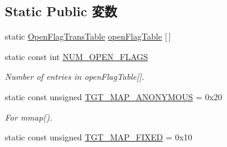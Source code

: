 \subsection*{Static Public 変数}
\begin{DoxyCompactItemize}
\item 
static \hyperlink{structOpenFlagTransTable}{OpenFlagTransTable} \hyperlink{classPowerLinux_ab1db5a531609b99b262cc849ea24765a}{openFlagTable} \mbox{[}$\,$\mbox{]}
\item 
static const int \hyperlink{classPowerLinux_ad85b9918c8f2c8739537a002dc1dc526}{NUM\_\-OPEN\_\-FLAGS}
\begin{DoxyCompactList}\small\item\em Number of entries in openFlagTable\mbox{[}\mbox{]}. \item\end{DoxyCompactList}\item 
static const unsigned \hyperlink{classPowerLinux_a0bbc267200567dd98250b99b6085a499}{TGT\_\-MAP\_\-ANONYMOUS} = 0x20
\begin{DoxyCompactList}\small\item\em For mmap(). \item\end{DoxyCompactList}\item 
static const unsigned \hyperlink{classPowerLinux_a0124e421d7846143bca15728b7a53e14}{TGT\_\-MAP\_\-FIXED} = 0x10
\end{DoxyCompactItemize}

